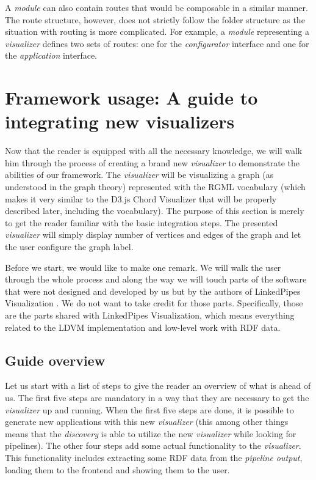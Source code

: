 A \emph{module} can also contain routes that would be composable in a similar manner. The route structure, however, does not strictly follow the folder structure as the situation with routing is more complicated. For example, a \emph{module} representing a \emph{visualizer} defines two sets of routes: one for the \emph{configurator} interface and one for the \emph{application} interface.

\section{Framework usage: A guide to integrating new visualizers}
\label{sec:implementation:integrating-visualizer}

Now that the reader is equipped with all the necessary knowledge, we will walk him through the process of creating a brand new \emph{visualizer} to demonstrate the abilities of our framework. The \emph{visualizer} will be visualizing a graph (as understood in the graph theory) represented with the RGML vocabulary (which makes it very similar to the D3.js Chord Visualizer that will be properly described later, including the vocabulary). The purpose of this section is merely to get the reader familiar with the basic integration steps. The presented \emph{visualizer} will simply display number of vertices and edges of the graph and let the user configure the graph label.

Before we start, we would like to make one remark. We will walk the user through the whole process and along the way we will touch parts of the software that were not designed and developed by us but by the authors of LinkedPipes Visualization \cite{linked_pipes_visualization}. We do not want to take credit for those parts. Specifically, those are the parts shared with LinkedPipes Visualization, which means everything related to the LDVM implementation and low-level work with RDF data.

\subsection{Guide overview}

Let us start with a list of steps to give the reader an overview of what is ahead of us. The first five steps are mandatory in a way that they are necessary to get the \emph{visualizer} up and running. When the first five steps are done, it is possible to generate new applications with this new \emph{visualizer} (this among other things means that the \emph{discovery} is able to utilize the new \emph{visualizer} while looking for pipelines). The other four steps add some actual functionality to the \emph{visualizer}. This functionality includes extracting some RDF data from the \emph{pipeline output}, loading them to the frontend and showing them to the user.

